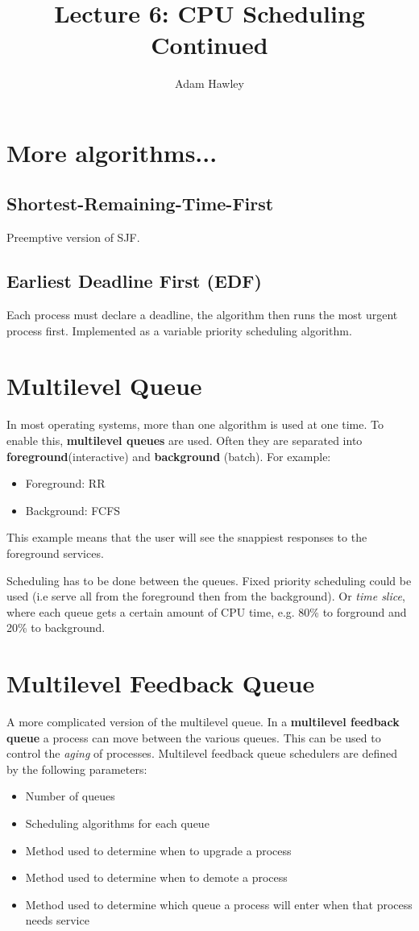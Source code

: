 \documentclass{article}
\author{Adam Hawley}
\title{Lecture 6: CPU Scheduling Continued}
\begin{document}
\maketitle
\tableofcontents
\newpage

\section{More algorithms...}
\subsection{Shortest-Remaining-Time-First}
Preemptive version of SJF.

\subsection{Earliest Deadline First (EDF)}
Each process must declare a deadline, the algorithm then runs the most urgent process first.
Implemented as a variable priority scheduling algorithm.

\section{Multilevel Queue}
In most operating systems, more than one algorithm is used at one time.
To enable this, \textbf{multilevel queues} are used.
Often they are separated into \textbf{foreground}(interactive) and \textbf{background} (batch).
For example:
\begin{itemize}
	\item Foreground: RR
	\item Background: FCFS
\end{itemize}
This example means that the user will see the snappiest responses to the foreground services.

Scheduling has to be done between the queues.
Fixed priority scheduling could be used (i.e serve all from the foreground then from the background).
Or \textit{time slice}, where each queue gets a certain amount of CPU time, e.g. 80\% to forground and 20\% to background.

\section{Multilevel Feedback Queue}
A more complicated version of the multilevel queue.
In a \textbf{multilevel feedback queue} a process can move between the various queues.
This can be used to control the \textit{aging} of processes.
Multilevel feedback queue schedulers are defined by the following parameters:
\begin{itemize}
	\item Number of queues
	\item Scheduling algorithms for each queue
	\item Method used to determine when to upgrade a process
	\item Method used to determine when to demote a process
	\item Method used to determine which queue a process will enter when that process needs service
\end{itemize}
\end{document}

